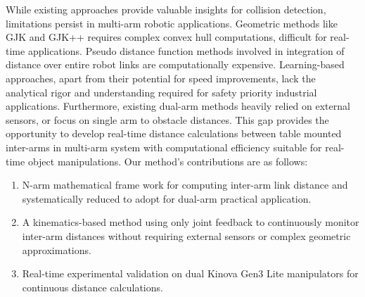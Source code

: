 \documentclass[10pt,twocolumn]{ICCAS}
\begin{document}
While existing approaches provide valuable insights for collision detection, limitations persist in multi-arm robotic applications. Geometric methods like GJK and GJK++ requires complex convex hull computations, difficult for real-time applications. Pseudo distance function methods involved in integration of distance over entire robot links are computationally expensive. Learning-based approaches, apart from their potential for speed improvements, lack the analytical rigor and understanding required for safety priority industrial applications. Furthermore, existing dual-arm methods heavily relied on external sensors, or focus on single arm to obstacle distances. This gap provides the opportunity to develop real-time distance calculations between table mounted inter-arms in multi-arm system with computational efficiency suitable for real-time object manipulations. Our method's contributions are as follows:
\begin{enumerate}[label=\roman*]
    \item N-arm mathematical frame work for computing inter-arm link distance and systematically reduced to adopt for dual-arm practical application.
    \item A kinematics-based method using only joint feedback to continuously monitor inter-arm distances without requiring external sensors or complex geometric approximations.
    \item Real-time experimental validation on dual Kinova Gen3 Lite manipulators for continuous distance calculations.
\end{enumerate}
\end{document}
